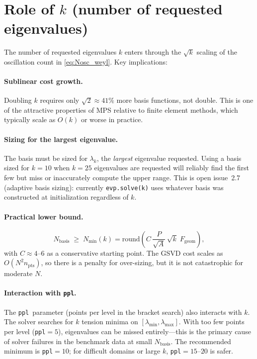 \documentclass[11pt]{article}
\newcommand{\Nbasis}{N_{\mathrm{basis}}}
\newcommand{\ppl}{\texttt{ppl}}
\begin{document}
\section{Role of \texorpdfstring{$k$}{k} (number of requested eigenvalues)}

The number of requested eigenvalues $k$ enters through the $\sqrt{k}$ scaling
of the oscillation count in \eqref{eq:Nosc_weyl}.  Key implications:

\paragraph{Sublinear cost growth.}
Doubling $k$ requires only $\sqrt{2}\approx 41\%$ more basis functions, not
double.  This is one of the attractive properties of MPS relative to finite
element methods, which typically scale as $O(k)$ or worse in practice.

\paragraph{Sizing for the largest eigenvalue.}
The basis must be sized for $\lambda_k$, the \emph{largest} eigenvalue requested.
Using a basis sized for $k=10$ when $k=25$ eigenvalues are requested will
reliably find the first few but miss or inaccurately compute the upper range.
This is open issue~2.7 (adaptive basis sizing): currently \texttt{evp.solve(k)}
uses whatever basis was constructed at initialization regardless of $k$.

\paragraph{Practical lower bound.}
\begin{equation}
  \Nbasis \;\geq\; N_{\min}(k)
  = \mathrm{round}\!\left(C\,\frac{P}{\sqrt{A}}\,\sqrt{k}\;F_{\mathrm{geom}}\right),
\end{equation}
with $C\approx 4$--$6$ as a conservative starting point.  The GSVD cost scales
as $O(N^2 n_{\mathrm{pts}})$, so there is a penalty for over-sizing, but it is
not catastrophic for moderate $N$.

\paragraph{Interaction with \ppl.}
The \ppl\ parameter (points per level in the bracket search) also interacts with
$k$.  The solver searches for $k$ tension minima on $[\lambda_{\min},\lambda_{\max}]$.
With too few points per level (\texttt{ppl}$=5$), eigenvalues can be missed
entirely---this is the primary cause of solver failures in the benchmark data at
small $\Nbasis$.  The recommended minimum is \texttt{ppl}$=10$; for difficult
domains or large $k$, \texttt{ppl}$=15$--$20$ is safer.
\end{document}
